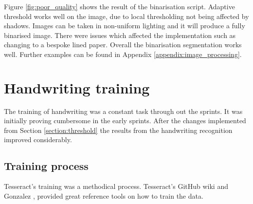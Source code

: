 Figure \ref{fig:poor_quality} shows the result of the binarisation script. Adaptive threshold works well on the image, due to local thresholding not being affected by shadows. Images can be taken in non-uniform lighting and it will produce a fully binarised image. There were issues which affected the implementation such as changing to a bespoke lined paper. Overall the binarisation segmentation works well. Further examples can be found in Appendix \ref{appendix:image_processing}.

\section{Handwriting training}
The training of handwriting was a constant task through out the sprints. It was initially proving cumbersome in the early sprints. After the changes implemented from Section \ref{section:threshold} the results from the handwriting recognition improved considerably.

\subsection{Training process}
Tesseract's training was a methodical process. Tesseract's GitHub wiki \cite{citeulike:13926796} and Gonzalez \cite{citeulike:13920943}, provided great reference tools on how to train the data.

